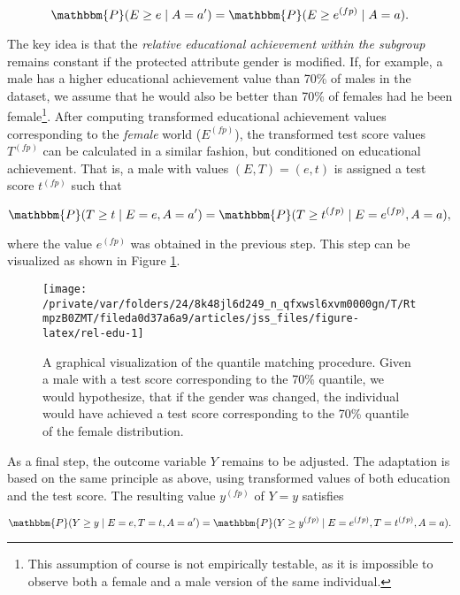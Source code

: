 \documentclass[
  nojss]{jss}
\begin{document}
\[\mathbbm{P}(E \geq e \mid A = a') = \mathbbm{P}(E \geq  {e}^{(fp)} \mid A = a).\]

The key idea is that the \emph{relative educational achievement within
the subgroup} remains constant if the protected attribute gender is
modified. If, for example, a male has a higher educational achievement
value than 70\% of males in the dataset, we assume that he would also be
better than 70\% of females had he been female\footnote{This assumption
  of course is not empirically testable, as it is impossible to observe
  both a female and a male version of the same individual.}. After
computing transformed educational achievement values corresponding to
the \emph{female} world (\( {E}^{(fp)}\)), the transformed test score
values \( {T}^{(fp)}\) can be calculated in a similar fashion, but
conditioned on educational achievement. That is, a male with values
\((E, T) = (e, t)\) is assigned a test score \( {t}^{(fp)}\) such that

\[\mathbbm{P}(T \geq t \mid E = e, A = a') = \mathbbm{P}(T \geq  {t}^{(fp)} \mid E =  {e}^{(fp)}, A = a),\]

where the value \( {e}^{(fp)}\) was obtained in the previous step. This
step can be visualized as shown in Figure \ref{fig:rel-edu}.

\begin{CodeChunk}
\begin{figure}

{\centering \texttt{[image: /private/var/folders/24/8k48jl6d249\_n\_qfxwsl6xvm0000gn/T/RtmpzB0ZMT/fileda0d37a6a9/articles/jss\_files/figure-latex/rel-edu-1]} 

}

\caption[A graphical visualization of the quantile matching procedure]{A graphical visualization of the quantile matching procedure. Given a male with a test score corresponding to the 70\% quantile, we would hypothesize, that if the gender was changed, the individual would have achieved a test score corresponding to the 70\% quantile of the female distribution.}\label{fig:rel-edu}
\end{figure}
\end{CodeChunk}

As a final step, the outcome variable \(Y\) remains to be adjusted. The
adaptation is based on the same principle as above, using transformed
values of both education and the test score. The resulting value
\( {y}^{(fp)}\) of \(Y = y\) satisfies

\[\mathbbm{P}(Y \geq y \mid E = e, T = t, A = a') = \mathbbm{P}(Y \geq  {y}^{(fp)} \mid E =  {e}^{(fp)}, T =  {t}^{(fp)}, A = a).\]
\end{document}

